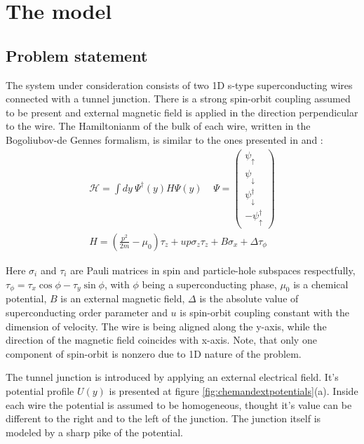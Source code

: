 \newcommand{\xbr}{\left(x\right)}
\newcommand{\br}[1]{\left(#1\right)}
\newcommand{\abs}[1]{\left|#1\right|}
\newcommand{\pdy}{\partial_y}
\newcommand{\pd}[1]{\partial_{#1}}

\chapter{The model}

\section{Problem statement}

The system under consideration consists of two 1D s-type superconducting wires connected with a tunnel junction. There is a strong spin-orbit coupling assumed to be present and external magnetic field is applied in the direction perpendicular to the wire. The Hamiltonianm of the bulk of each wire, written in the Bogoliubov-de Gennes formalism, is similar to the ones presented in \cite{Oreg_2010} and \cite{Lutchyn_2010}:
\begin{gather}
	\mathcal{H}
	=
	\int dy ~
	\Psi^\dagger
	\br{y}
	H
	\Psi
	\br{y}
	\
	~~~~
	\Psi
	=
	\begin{pmatrix}
		\psi_\uparrow
		\\
		\psi_\downarrow
		\\
		\psi_\downarrow^\dagger
		\\
		-\psi_\uparrow^\dagger
	\end{pmatrix}
	\\
	\label{bulk_Hamiltonian}
	H
	=
	\br{
		\frac{p^2}{2m}
		-\mu_0
	}\tau_z
	+
	u p \sigma_z \tau_z
	+
	B\sigma_x	
	+
	\Delta\tau_\phi
\end{gather}

Here $ \sigma_i $ and $ \tau_i $ are Pauli matrices in spin and particle-hole subspaces respectfully, $ \tau_\phi = \tau_x \cos\phi - \tau_y \sin\phi$, with $ \phi $ being a superconducting phase, $ \mu_0 $ is a chemical potential, $ B $ is an external magnetic field, $ \Delta $ is the absolute value of superconducting order parameter and $ u $ is spin-orbit coupling constant with the dimension of velocity. The wire is being aligned along the y-axis, while the direction of the magnetic field coincides with x-axis. Note, that only one component of spin-orbit is nonzero due to 1D nature of the problem.

The tunnel junction is introduced  by applying an external electrical field. It's potential profile $U\br{y}  $ is presented at figure \ref{fig:chemandextpotentials}(a). Inside each wire the potential is assumed to be homogeneous, thought it's value can be different to the right and to the left of the junction. The junction itself is modeled by a sharp pike of the potential.
 
